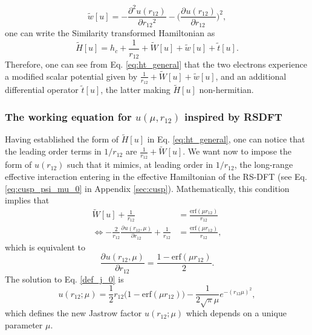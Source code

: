 \documentclass[aip,jcp,reprint,noshowkeys,superscriptaddress,twocolumn]{revtex4-1}
\newcommand{\deriv}[3]{\frac{\partial^{#3} #1}{\partial {#2}^{#3}}}
\begin{document}
\begin{equation}
 \label{eq:def_wt}
 \tilde{w}[u] = -\deriv{u(r_{12})}{r_{12}}{2} - \bigg( \deriv{u(r_{12})}{r_{12}}{} \bigg)^2, 
\end{equation}
one can write the Similarity transformed Hamiltonian  as
\begin{equation}
 \label{eq:ht_general}
 \tilde{H}[u] = h_c + \frac{1}{r_{12}}  + \tilde{W}[u] + \tilde{w}[u] + \tilde{t}[u].
\end{equation}
Therefore, one can see from Eq. \eqref{eq:ht_general} that the two electrons experience a modified scalar potential given by $\frac{1}{r_{12}}  + \tilde{W}[u] + \tilde{w}[u]$, and an additional differential operator $\tilde{t}[u]$, 
the latter making $\tilde{H}[u]$ non-hermitian. 

\subsubsection{The working equation for $u(\mu,r_{12})$ inspired by RSDFT}
Having established the form of $\tilde{H}[u] $ in Eq. \eqref{eq:ht_general}, one can notice that the leading order terms in $1/r_{12}$ are $\frac{1}{r_{12}}  + \tilde{W}[u]$. We want now to impose the form of $u(r_{12})$ such that it mimics, at leading order in $1/r_{12}$, the long-range effective interaction entering in the effective Hamiltonian of the RS-DFT (see Eq. \eqref{eq:cusp_psi_mu_0} in Appendix \ref{sec:cusp}). 
Mathematically, this condition implies that 
\begin{equation}
 \begin{aligned}
 \label{def_j_00}
 \tilde{W}[u] + \frac{1}{r_{12}}&= \frac{\text{erf}(\mu r_{12})}{r_{12}} \\ 
\Leftrightarrow -\frac{2}{r_{12}} \deriv{u(r_{12},\mu)}{r_{12}}{} + \frac{1}{r_{12}} & = \frac{\text{erf}(\mu r_{12})}{r_{12}}, 
 \end{aligned}
\end{equation}
which is equivalent to 
\begin{equation}
 \label{def_j_0}
 \deriv{u(r_{12},\mu)}{r_{12}}{} = \frac{1 - \text{erf}(\mu r_{12})}{2}.
\end{equation}
The solution to Eq. \eqref{def_j_0} is 
\begin{equation}
 \label{eq:def_j}
 u(r_{12};\mu) = \frac{1}{2}r_{12}\bigg( 1 - \text{erf}(\mu r_{12})  \bigg) - \frac{1}{2\sqrt{\pi}\mu}e^{-(r_{12}\mu)^2},
\end{equation}
which defines the new Jastrow factor $u(r_{12};\mu)$ which depends on a unique parameter $\mu$.  
\end{document}

